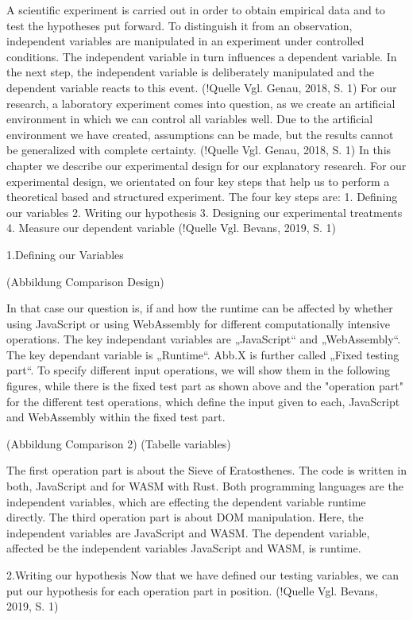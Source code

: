 A scientific experiment is carried out in order to obtain empirical data and to test the hypotheses put forward. To distinguish it from an observation, independent variables are manipulated in an experiment under controlled conditions. The independent variable in turn influences a dependent variable. In the next step, the independent variable is deliberately manipulated and the dependent variable reacts to this event. (!Quelle Vgl. Genau, 2018, S. 1)
For our research, a laboratory experiment comes into question, as we create an artificial environment in which we can control all variables well. Due to the artificial environment we have created, assumptions can be made, but the results cannot be generalized with complete certainty. (!Quelle Vgl. Genau, 2018, S. 1)
In this chapter we describe our experimental design for our explanatory research. 
For our experimental design, we orientated on four key steps that help us to perform a theoretical based and structured experiment. The four key steps are: 
1.	Defining our variables
2.	Writing our hypothesis
3.	Designing our experimental treatments
4.	Measure our dependent variable
(!Quelle Vgl. Bevans, 2019, S. 1)

1.Defining our Variables

(Abbildung Comparison Design)

In that case our question is, if and how the runtime can be affected by whether using JavaScript or using WebAssembly for different computationally intensive operations. The key independant variables are „JavaScript“ and „WebAssembly“. The key dependant variable is „Runtime“. Abb.X is further called „Fixed testing part“.
To specify different input operations, we will show them in the following figures, while there is the fixed test part as shown above and the "operation part" for the different test operations, which define the input given to each, JavaScript and WebAssembly within the fixed test part.

(Abbildung Comparison 2)
(Tabelle variables)

The first operation part is about the Sieve of Eratosthenes. The code is written in both, JavaScript and for WASM with Rust. Both programming languages are the independent variables, which are effecting the dependent variable runtime directly.
The third operation part is about DOM manipulation. Here, the independent variables are JavaScript and WASM. The dependent variable, affected be the independent variables JavaScript and WASM, is runtime.

2.Writing our hypothesis
Now that we have defined our testing variables, we can put our hypothesis for each operation part in position. (!Quelle Vgl. Bevans, 2019, S. 1)

